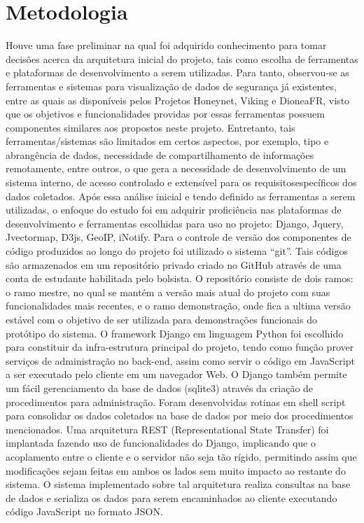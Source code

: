 \documentclass[%
        TwoSidePages,%
        Portuguese,%
        TablesPage,%
        FiguresPage,%
        ]
{ic-tese-v2}
\begin{document}
\chapter{Metodologia}
Houve uma fase preliminar na qual foi adquirido conhecimento para tomar decisões acerca da arquitetura inicial do projeto, tais como escolha de ferramentas e plataformas de desenvolvimento a serem utilizadas.
Para tanto, observou-se as ferramentas e sistemas para visualização de dados de segurança já existentes, entre as quais as disponíveis pelos Projetos Honeynet, Viking e DioneaFR, visto que os objetivos e funcionalidades providas por essas ferramentas possuem componentes similares aos propostos neste projeto. Entretanto, tais ferramentas/sistemas são limitados em certos aspectos, por exemplo, tipo e abrangência de dados, necessidade de compartilhamento de informações remotamente, entre outros, o que gera a necessidade de desenvolvimento de um sistema interno, de acesso controlado e extensível para os requisitosespecíficos dos dados coletados.
Após essa análise inicial e tendo definido as ferramentas a serem utilizadas, o enfoque do estudo foi em adquirir proficiência nas plataformas de desenvolvimento e ferramentas escolhidas para uso no projeto: Django, Jquery, Jvectormap, D3js, GeoIP, iNotify.
Para o controle de versão dos componentes de código produzidos ao longo do projeto foi utilizado o sistema “git”. Tais códigos são armazenados em um repositório privado criado no GitHub através de uma conta de estudante habilitada pelo bolsista. O repositório consiste de dois ramos: o ramo mestre, no qual se mantém a versão mais atual do projeto com suas funcionalidades mais recentes, e o ramo demonstração, onde fica a ultima versão estável com o objetivo de ser utilizada para demonstrações funcionais do protótipo do sistema.
O framework Django em linguagem Python foi escolhido para constituir da infra-estrutura principal do projeto, tendo como função prover serviços de administração no back-end, assim como servir o código em JavaScript a ser executado pelo cliente em um navegador Web. O Django também permite um fácil gerenciamento da base de dados (sqlite3) através da criação de procedimentos para administração. Foram desenvolvidas rotinas em shell script para consolidar os dados coletados na base de dados por meio dos procedimentos mencionados.
Uma arquitetura REST (Representational State Transfer) foi implantada fazendo uso de funcionalidades do Django, implicando que o acoplamento entre o cliente e o servidor não seja tão rígido, permitindo assim que modificações sejam feitas em ambos os lados sem muito impacto ao restante do sistema. O sistema implementado sobre tal arquitetura realiza consultas na base de dados e serializa os dados para serem encaminhados ao cliente executando código JavaScript no formato JSON.
\end{document}
